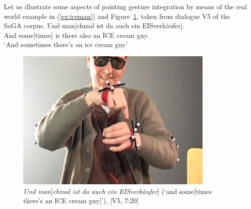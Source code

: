 \documentclass[output=paper
                ,modfonts
                ,nonflat
	        ,collection
	        ,collectionchapter
	        ,collectiontoclongg
 	        ,biblatex
                ,babelshorthands
                ,newtxmath
                ,draftmode
                ,colorlinks, citecolor=brown
]{./langsci/langscibook}
\begin{document}
Let us illustrate some aspects of pointing gesture integration by means of the real world example in (\ref{ex:iceman}) and Figure~\ref{fig:iceman}, taken from dialogue V5 of the SaGA corpus. %
%
\ea \label{ex:iceman}
\gll Und man[chmal ist da auch ein {EISverkäufer}]. \\
     And some[times] is there also an {ICE cream guy}. \\
\glt \enquote*{And sometimes there's an ice cream guy}
\z 

\begin{figure}[tb]
  \centering
  \includegraphics[width=0.5\linewidth]{figures/iceman}
  \caption[Ice cream guy]{\textit{Und man}[\textit{chmal ist da auch ein EISverkäufer}] (\enquote*{and some[times there's an ICE cream guy]}), [V5, 7:20]}
  \label{fig:iceman}
\end{figure}
\end{document}
